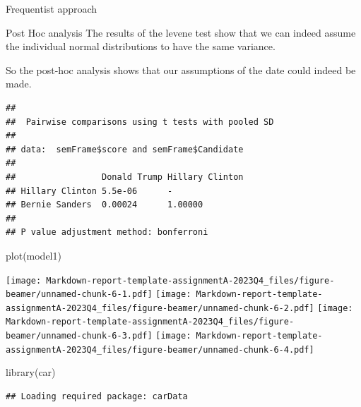 \documentclass[
  ignorenonframetext,
]{beamer}
\newenvironment{Shaded}{\begin{snugshade}}{\end{snugshade}}
\newcommand{\AttributeTok}[1]{\textcolor[rgb]{0.77,0.63,0.00}{#1}}
\newcommand{\CommentTok}[1]{\textcolor[rgb]{0.56,0.35,0.01}{\textit{#1}}}
\newcommand{\ConstantTok}[1]{\textcolor[rgb]{0.00,0.00,0.00}{#1}}
\newcommand{\FunctionTok}[1]{\textcolor[rgb]{0.00,0.00,0.00}{#1}}
\newcommand{\NormalTok}[1]{#1}
\newcommand{\SpecialCharTok}[1]{\textcolor[rgb]{0.00,0.00,0.00}{#1}}
\newcommand{\StringTok}[1]{\textcolor[rgb]{0.31,0.60,0.02}{#1}}
\begin{document}
\begin{frame}[fragile]{Frequentist approach}
\begin{block}{Post Hoc analysis}
The results of the levene test show that we can indeed assume the
individual normal distributions to have the same variance.

So the post-hoc analysis shows that our assumptions of the date could
indeed be made.

\begin{Shaded}
\end{Shaded}

\begin{verbatim}
## 
##  Pairwise comparisons using t tests with pooled SD 
## 
## data:  semFrame$score and semFrame$Candidate 
## 
##                 Donald Trump Hillary Clinton
## Hillary Clinton 5.5e-06      -              
## Bernie Sanders  0.00024      1.00000        
## 
## P value adjustment method: bonferroni
\end{verbatim}

\begin{Shaded}
\begin{Highlighting}[]
\FunctionTok{plot}\NormalTok{(model1)}
\end{Highlighting}
\end{Shaded}

\texttt{[image: Markdown-report-template-assignmentA-2023Q4\_files/figure-beamer/unnamed-chunk-6-1.pdf]}
\texttt{[image: Markdown-report-template-assignmentA-2023Q4\_files/figure-beamer/unnamed-chunk-6-2.pdf]}
\texttt{[image: Markdown-report-template-assignmentA-2023Q4\_files/figure-beamer/unnamed-chunk-6-3.pdf]}
\texttt{[image: Markdown-report-template-assignmentA-2023Q4\_files/figure-beamer/unnamed-chunk-6-4.pdf]}

\begin{Shaded}
\begin{Highlighting}[]
\FunctionTok{library}\NormalTok{(car)}
\end{Highlighting}
\end{Shaded}

\begin{verbatim}
## Loading required package: carData
\end{verbatim}


\end{block}
\end{frame}
\end{document}
